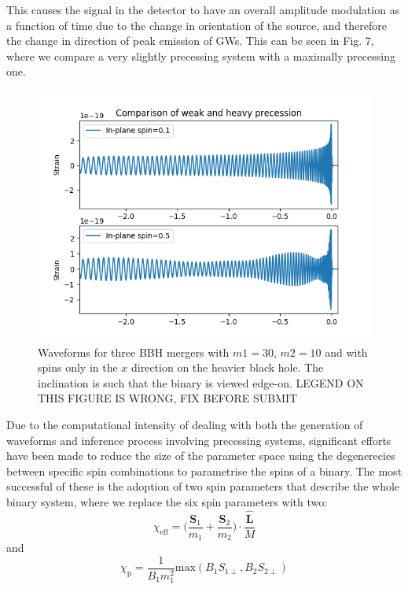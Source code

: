 \documentclass[11pt]{article}
\begin{document}
This causes the signal in the detector to have an overall amplitude modulation as a function of time due to the change in orientation of the source, and therefore the change in direction of peak emission of GWs. This can be seen in Fig. 7, where we compare a very slightly precessing system with a maximally precessing one.
\begin{figure}[h]
	\includegraphics[scale=1]{fig7.png}
	\centering
	\caption{Waveforms for three BBH mergers with $m1=30$, $m2=10$ and with spins only in the $x$ direction on the heavier black hole. The inclination is such that the binary is viewed edge-on. LEGEND ON THIS FIGURE IS WRONG, FIX BEFORE SUBMIT}
	\centering
\end{figure}
Due to the computational intensity of dealing with both the generation of waveforms and inference process involving precessing systems, significant efforts have been made to reduce the size of the parameter space using the degenerecies between specific spin combinations to parametrise the spins of a binary. The most successful of these is the adoption of two spin parameters\cite{imr}\cite{chip} that describe the whole binary system, where we replace the six spin parameters with two:
\begin{equation}
\chi_{\text{eff}}=\bigg(\frac{\mathbf{S}_1}{m_1}+\frac{\mathbf{S}_2}{m_2}\bigg)\cdot\frac{\mathbf{\hat{L}}}{M}
\end{equation}
and
\begin{equation}
\chi_\text{p}=\frac{1}{B_1m^2_1}\text{max}(B_1S_{1\perp},B_2S_{2\perp})
\end{equation}
\end{document}
